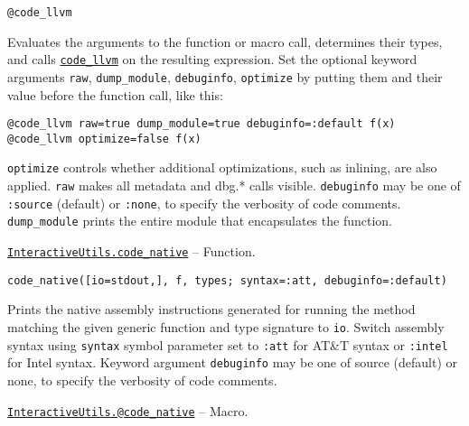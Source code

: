 \begin{adjustwidth}{2em}{0pt}


\begin{verbatim}
@code_llvm
\end{verbatim}

Evaluates the arguments to the function or macro call, determines their types, and calls \hyperlink{1749471484368489435}{\texttt{code\_llvm}} on the resulting expression. Set the optional keyword arguments \texttt{raw}, \texttt{dump\_module}, \texttt{debuginfo}, \texttt{optimize} by putting them and their value before the function call, like this:


\begin{lstlisting}
@code_llvm raw=true dump_module=true debuginfo=:default f(x)
@code_llvm optimize=false f(x)
\end{lstlisting}

\texttt{optimize} controls whether additional optimizations, such as inlining, are also applied. \texttt{raw} makes all metadata and dbg.* calls visible. \texttt{debuginfo} may be one of \texttt{:source} (default) or \texttt{:none},  to specify the verbosity of code comments. \texttt{dump\_module} prints the entire module that encapsulates the function.



\end{adjustwidth}
\hypertarget{2534314152947301270}{} 
\hyperlink{2534314152947301270}{\texttt{InteractiveUtils.code\_native}}  -- {Function.}

\begin{adjustwidth}{2em}{0pt}


\begin{verbatim}
code_native([io=stdout,], f, types; syntax=:att, debuginfo=:default)
\end{verbatim}

Prints the native assembly instructions generated for running the method matching the given generic function and type signature to \texttt{io}. Switch assembly syntax using \texttt{syntax} symbol parameter set to \texttt{:att} for AT\&T syntax or \texttt{:intel} for Intel syntax. Keyword argument \texttt{debuginfo} may be one of source (default) or none, to specify the verbosity of code comments.



\end{adjustwidth}
\hypertarget{2629340111434042067}{} 
\hyperlink{2629340111434042067}{\texttt{InteractiveUtils.@code\_native}}  -- {Macro.}

